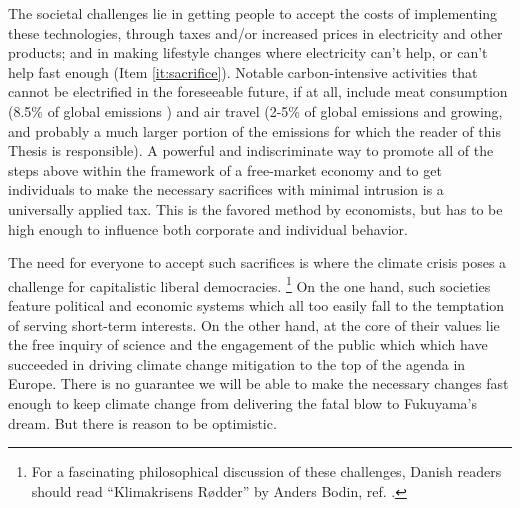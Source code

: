 The societal challenges lie in getting people to accept the costs of implementing these technologies, through taxes and/or increased prices in electricity and other products; and in making lifestyle changes where electricity can't help, or can't help fast enough (Item \ref{it:sacrifice}). Notable carbon-intensive activities that cannot be electrified in the foreseeable future, if at all, include meat consumption (8.5\% of global emissions \cite{Caro2017}) and air travel (2-5\% of global emissions and growing\cite{CarbonBrief_aviation, Larsson2018}, and probably a much larger portion of the emissions for which the reader of this Thesis is responsible). A powerful and indiscriminate way to promote all of the steps above within the framework of a free-market economy and to get individuals to make the necessary sacrifices with minimal intrusion is a universally applied  tax. This is the favored method by economists\cite{CarbonTax_Economist}, but has to be high enough to influence both corporate and individual behavior.

The need for everyone to accept such sacrifices is where the climate crisis poses a challenge for capitalistic liberal democracies.
\footnote{For a fascinating philosophical discussion of these challenges, Danish readers should read ``Klimakrisens R\o dder'' by Anders Bodin, ref. \cite{Bodin2019}.} 
On the one hand, such societies feature political and economic systems which all too easily fall to the temptation of serving short-term interests. On the other hand, at the core of their values lie the free inquiry of science and the engagement of the public which which have succeeded in driving climate change mitigation to the top of the agenda in Europe. There is no guarantee we will be able to make the necessary changes fast enough to keep climate change from delivering the fatal blow to Fukuyama's dream. But there is reason to be optimistic.


 






